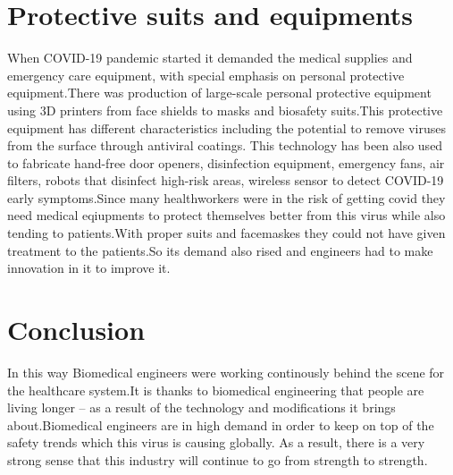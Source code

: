 \documentclass{article}[A4,12pt]
\begin{document}
\section{Protective suits and equipments}
When COVID-19 pandemic started it demanded the medical supplies and emergency care equipment, with special emphasis on personal protective equipment.There was production of large-scale personal protective equipment using 3D printers from face shields to masks and biosafety suits.This protective equipment has different characteristics including the potential to remove viruses from the surface through antiviral coatings. This technology has been also used to fabricate hand-free door openers, disinfection equipment, emergency fans, air filters, robots that disinfect high-risk areas, wireless sensor to detect COVID-19 early symptoms.Since many healthworkers were in the risk of getting covid they need medical eqiupments to protect themselves better from this virus while also tending to patients.With proper suits and facemaskes they could not have given treatment to the patients.So its demand also rised and engineers had to make innovation in it to improve it.

\section*{Conclusion}
In this way Biomedical engineers were working continously behind the scene for the healthcare system.It is thanks to biomedical engineering that people are living longer – as a result of the technology and modifications it brings about.Biomedical engineers are in high demand in order to keep on top of the safety trends which this virus is causing globally. As a result, there is a very strong sense that this industry will continue to go from strength to strength.
\end{document}
